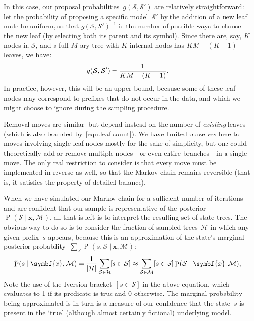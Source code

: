 \documentclass[12pt,a4paper]{article}
\newcommand\mc[1]{\mathcal{#1}}               %
\newcommand\ub[1]{\symbf{#1}}                 %
\DeclareMathOperator\Pb{P}                    %
\DeclarePairedDelimiter\lr{\lparen}{\rparen}  %
\DeclarePairedDelimiter\abs{\lvert}{\rvert}   %
\begin{document}
In this case, our proposal probabilities~\(g(\mc{S}, \mc{S}')\) are relatively
straightforward: let the probability of proposing a specific model~\(\mc{S}'\)
by the addition of a new leaf node be uniform, so that \(g(\mc{S},
\mc{S}')^{-1}\) is the number of possible ways to choose the new leaf (by
selecting both its parent and its symbol). Since there are, say, \(K\) nodes in
\(\mc{S}\), and a full \(M\)-ary tree with \(K\) internal nodes has \(KM -
(K-1)\) leaves, we have:
\begin{equation}\label{eqn:leaf count}
  g\lr{\mc{S}, \mc{S}'} = \frac{1}{KM - (K-1)}.
\end{equation}
In practice, however, this will be an upper bound, because some of these leaf
nodes may correspond to prefixes that do not occur in the data, and which we
might choose to ignore during the sampling procedure. 

Removal moves are similar, but depend instead on the number of \emph{existing}
leaves (which is also bounded by~\eqref{eqn:leaf count}). We have limited
ourselves here to moves involving single leaf nodes mostly for the sake of
simplicity, but one could theoretically add or remove multiple nodes---or even
entire branches---in a single move. The only real restriction to consider is
that every move must be implemented in reverse as well, so that the Markov chain
remains reversible (that is, it satisfies the property of detailed balance).

When we have simulated our Markov chain for a sufficient number of iterations
and are confident that our sample is representative of the
posterior~\(\Pb(\mc{S} \mid \ub{x}, \mc{M})\), all that is left is to interpret
the resulting set of state trees. The obvious way to do so is to consider the
fraction of sampled trees~\(\mc{H}\) in which any given prefix~\(s\) appears,
because this is an approximation of the state's marginal posterior
probability~\(\sum_{\mc{S}} \Pb(s, \mc{S} \mid \ub{x}, \mc{M})\):
\begin{equation*}
  \hat{\Pb}(s \mid \ub{x}, \mc{M}) =
      \frac{1}{\abs{\mc{H}}} \sum_{\mc{S}\in\mc{H}} [s \in \mc{S}]
    \approx \sum_{\mc{S}\in\mc{M}} [s \in \mc{S}] \Pb(\mc{S} \mid \ub{x}, \mc{M}),
\end{equation*}
Note the use of the Iversion bracket~\([s \in \mc{S}]\) in the above equation,
which evaluates to 1 if its predicate is true and 0 otherwise. The marginal
probability being approximated is in turn is a measure of our confidence that
the state~\(s\) is present in the `true' (although almost certainly fictional)
underlying model.
\end{document}
